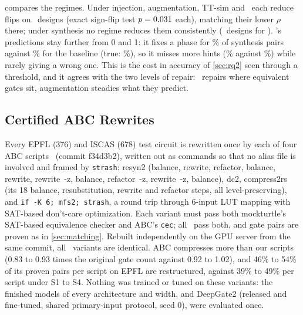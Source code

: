 \begin{table}[h]
\centering\scriptsize
\caption{Decision consequences on restructured pairs (5 seeds, width 64). Flip: phase decisions ($\theta=0.01$) that differ
between the two implementations (\%); Err.: decisions on $v$ that differ from those on the true probability (\%);
Jacc.: overlap of the 5\% hardest-to-activate gates across a rewrite (1 for the true probabilities).}
\label{tab:app_decisions}
\resizebox{\columnwidth}{!}{}
\end{table}
 compares the regimes. Under injection, augmentation, TT-sim and \ours\ each reduce flips on \DecOursInjBetter\ designs
(exact sign-flip test $p=0.031$ each), matching their lower $\rho$ there; under synthesis no regime reduces them
consistently (\DecOursSynBetter\ designs for \ours). \ours's predictions stay further from 0 and 1: it fixes a phase for
\DecOursHintSyn\% of synthesis pairs against \DecBaseHintSyn\% for the baseline (true: \DecTrueHintSyn\%), so it misses
more hints (\DecOursMissSyn\% against \DecBaseMissSyn\%) while rarely giving a wrong one. This is the cost in accuracy
of \cref{sec:rq2} seen through a threshold, and it agrees with the two levels of repair: \ours\ repairs where equivalent
gates sit, augmentation steadies what they predict.

\subsection{Certified ABC Rewrites}\label{app:abc}
Every EPFL (376) and ISCAS (678) test circuit is rewritten once by each of four ABC scripts~\cite{DBLP:conf/cav/BraytonM10} (commit
f34d3b2), written out as commands so that no alias file is involved and framed by \texttt{strash}: resyn2 (balance, rewrite,
refactor, balance, rewrite, rewrite~-z, balance, refactor~-z, rewrite~-z, balance), dc2, compress2rs (its 18 balance,
resubstitution, rewrite and refactor steps, all level-preserving), and \texttt{if -K 6; mfs2; strash}, a round trip
through 6-input LUT mapping with SAT-based don't-care optimization. Each variant must pass both mockturtle's SAT-based
equivalence checker and ABC's \texttt{cec}; all \AbcVariants\ pass both, and gate pairs are proven as in
\cref{sec:matching}. Rebuilt independently on the GPU server from the same commit, all \AbcIdentical\ variants are identical.
ABC compresses more than our scripts (0.83 to 0.93 times the original gate count against 0.92 to 1.02), and 46\% to
54\% of its proven pairs per script on EPFL are restructured, against 39\% to 49\% per script under S1 to S4. Nothing was trained or tuned on these
variants: the finished models of every architecture and width, and DeepGate2 (released and fine-tuned, shared
primary-input protocol, seed 0), were evaluated once.

